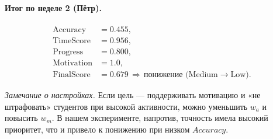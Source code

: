 \documentclass[12pt,a4paper]{article}
\begin{document}
\paragraph{Итог по неделе 2 (Пётр).}
\[
\begin{aligned}
\text{Accuracy} &= 0.455,\\
\text{TimeScore} &= 0.956,\\
\text{Progress} &= 0.800,\\
\text{Motivation} &= 1.0,\\
\text{FinalScore} &= 0.679 \,\Rightarrow \, \text{понижение (Medium}\rightarrow\text{Low)}.
\end{aligned}
\]

\medskip
\noindent\textit{Замечание о настройках.} Если цель — поддерживать мотивацию и «не штрафовать» студентов при высокой активности,
можно уменьшить $w_a$ и повысить $w_m$. В нашем эксперименте, напротив, точность имела высокий приоритет,
что и привело к понижению при низком $Accuracy$.
\end{document}
